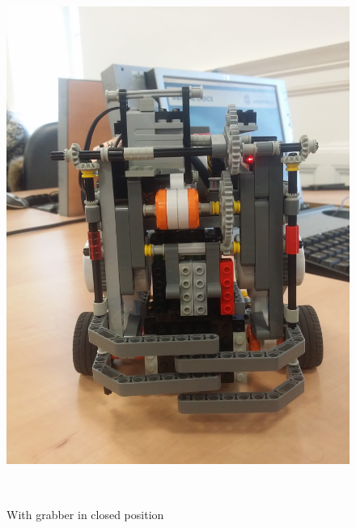 \documentclass[12pt]{article}
\begin{document}
\begin{figure}[ht]
	\centering
	\begin{minipage}[b]{.48\textwidth}
        \centering
		\includegraphics[scale=0.065, angle=-90]{closed_front.jpg}
		\caption{With grabber in closed position}
		\label{fig:closed}
	\end{minipage}
	~
	\begin{minipage}[b]{.48\textwidth}
        \centering

\end{minipage}
\end{figure}
\end{document}
